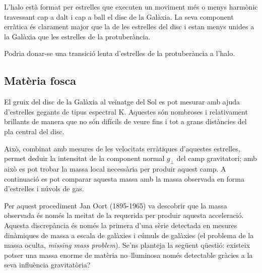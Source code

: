 L'halo està format per estrelles que executen un moviment més o menys harmònic travessant cap a dalt i cap a ball el disc de la Galàxia. La seva component erràtica és clarament major que la de les estrelles del disc i estan menys unides a la Galàxia que les estrelles de la protuberància.

Podria donar-se una transició lenta d'estrelles de la protuberància a l'halo.

\subsection{Matèria fosca}
El gruix del disc de la Galàxia al veïnatge del Sol es pot mesurar amb ajuda d'estrelles gegants de tipus espectral K. Aquestes són nombroses i relativament brillants de manera que no són difícils de veure fins i tot a grans distàncies del pla central del disc.

Això, combinat amb mesures de les velocitats erràtiques d'aquestes estrelles, permet deduir la intensitat de la component normal $g_{\perp}$ del camp gravitatori; amb això es pot trobar la massa local necessària per produir aquest camp. A continuació es pot comparar aquesta massa amb la massa observada en forma d'estrelles i núvols de gas.

Per aquest procediment Jan Oort (1895-1965) va descobrir que la massa observada és només la meitat de la requerida per produir aquesta acceleració. Aquesta discrepància és només la primera d'una sèrie detectada en mesures dinàmiques de massa a escala de galàxies i cúmuls de galàxies (el problema de la massa oculta, \textit{missing mass problem}). Se'ns planteja la següent qüestió: existeix potser una massa enorme de matèria no--lluminosa només detectable gràcies a la seva influència gravitatòria?

